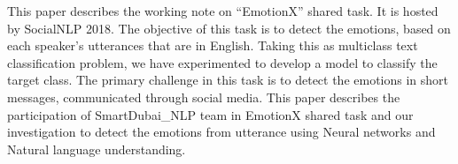 This paper describes the working note on ``EmotionX'' shared task. It is hosted by SocialNLP 2018. The objective of this task is to detect the emotions, based on each speaker's utterances that are in English. Taking this as multiclass text classification problem, we have experimented to develop a model to classify the target class. The primary challenge in this task is to detect the emotions in short messages, communicated through social media. This paper describes the participation of SmartDubai\_NLP team in EmotionX shared task and our investigation to detect the emotions from utterance using Neural networks and Natural language understanding.
